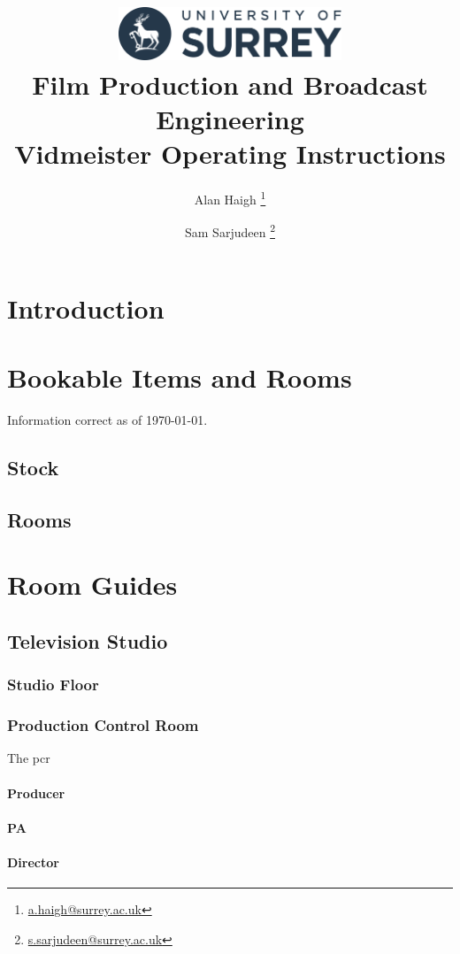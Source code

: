 \documentclass{report}
\title{
\includegraphics[width=0.5\textwidth]{uos-logo.png}\\
Film Production and Broadcast Engineering\\Vidmeister Operating Instructions
}
\author{Alan Haigh \thanks{\href{mailto:a.haigh@surrey.ac.uk}{a.haigh@surrey.ac.uk}} \and Sam Sarjudeen \thanks{\href{mailto:s.sarjudeen@surrey.ac.uk}{s.sarjudeen@surrey.ac.uk}}}
\begin{document}
\maketitle

\chapter*{Introduction}

\chapter{Bookable Items and Rooms}

Information correct as of \today.

\section{Stock}



\section{Rooms}



\chapter{Room Guides}

\section{Television Studio}
\subsection{Studio Floor}
\subsection{Production Control Room}
The \gls{pcr}
\subsubsection{Producer}
\subsubsection{PA}
\subsubsection{Director}
\end{document}
